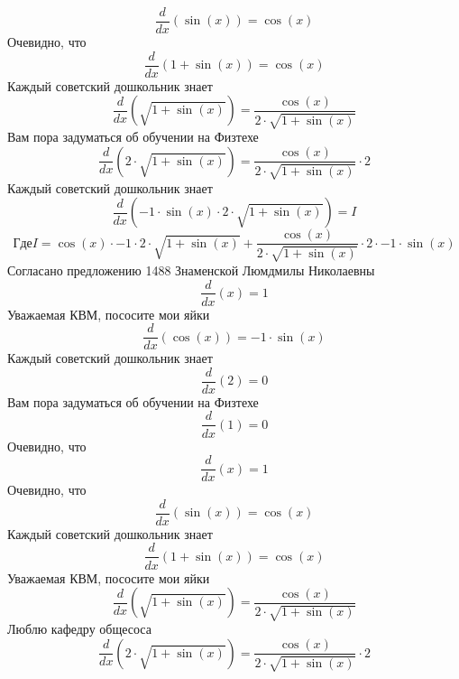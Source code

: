\documentclass[12pt, a4paper]{article}
\begin{document}
\begin{equation}
\frac{d}{dx}(\sin(x)) = \cos(x)
\end{equation}
Очевидно, что
\begin{equation}
\frac{d}{dx}(1+\sin(x)) = \cos(x)
\end{equation}
Каждый советский дошкольник знает
\begin{equation}
\frac{d}{dx}(\sqrt{1+\sin(x)}) = \frac{\cos(x)}{2 \cdot \sqrt{1+\sin(x)}}
\end{equation}
Вам пора задуматься об обучении на Физтехе
\begin{equation}
\frac{d}{dx}(2 \cdot \sqrt{1+\sin(x)}) = \frac{\cos(x)}{2 \cdot \sqrt{1+\sin(x)}} \cdot 2
\end{equation}
Каждый советский дошкольник знает
\begin{equation}
\frac{d}{dx}(-1 \cdot \sin(x) \cdot 2 \cdot \sqrt{1+\sin(x)}) = I
\end{equation}
$$Где I = \cos(x) \cdot -1 \cdot 2 \cdot \sqrt{1+\sin(x)}+\frac{\cos(x)}{2 \cdot \sqrt{1+\sin(x)}} \cdot 2 \cdot -1 \cdot \sin(x)$$
Согласано предложению 1488 Знаменской Люмдмилы Николаевны
\begin{equation}
\frac{d}{dx}(x) = 1
\end{equation}
Уважаемая КВМ, пососите мои яйки
\begin{equation}
\frac{d}{dx}(\cos(x)) = -1 \cdot \sin(x)
\end{equation}
Каждый советский дошкольник знает
\begin{equation}
\frac{d}{dx}(2) = 0
\end{equation}
Вам пора задуматься об обучении на Физтехе
\begin{equation}
\frac{d}{dx}(1) = 0
\end{equation}
Очевидно, что
\begin{equation}
\frac{d}{dx}(x) = 1
\end{equation}
Очевидно, что
\begin{equation}
\frac{d}{dx}(\sin(x)) = \cos(x)
\end{equation}
Каждый советский дошкольник знает
\begin{equation}
\frac{d}{dx}(1+\sin(x)) = \cos(x)
\end{equation}
Уважаемая КВМ, пососите мои яйки
\begin{equation}
\frac{d}{dx}(\sqrt{1+\sin(x)}) = \frac{\cos(x)}{2 \cdot \sqrt{1+\sin(x)}}
\end{equation}
Люблю кафедру общесоса
\begin{equation}
\frac{d}{dx}(2 \cdot \sqrt{1+\sin(x)}) = \frac{\cos(x)}{2 \cdot \sqrt{1+\sin(x)}} \cdot 2
\end{equation}
\end{document}
